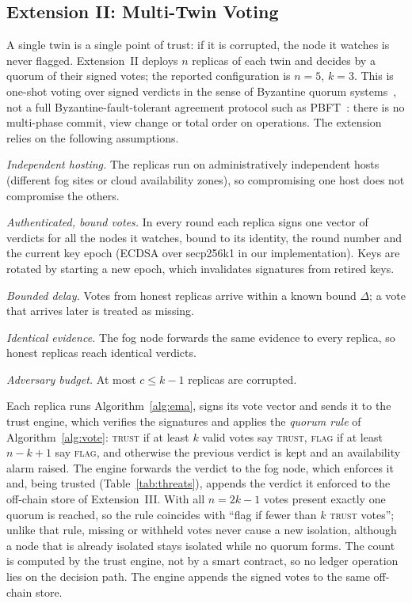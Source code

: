 \documentclass[lineno,pdflatex,sn-nature]{sn-jnl}
\theoremstyle{thmstyleone}%
\theoremstyle{thmstylethree}%
\begin{document}
\subsection{Extension II: Multi-Twin Voting}
\label{sec:ext2}
A single twin is a single point of trust: if it is corrupted, the
node it watches is never flagged.  Extension~II deploys $n$ replicas
of each twin and decides by a quorum of their signed votes; the
reported configuration is $n=5$, $k=3$.  This is one-shot voting over
signed verdicts in the sense of Byzantine quorum
systems~\cite{malkhi1998byzantine}, not a full Byzantine-fault-tolerant
agreement protocol such as PBFT~\cite{castro2002practical}: there is no
multi-phase commit, view change or total order on operations.  The
extension relies on the following assumptions.
\begin{list}{}{\setlength{\leftmargin}{3.4em}\setlength{\labelwidth}{3.0em}\setlength{\labelsep}{0.4em}\setlength{\itemsep}{1pt}\setlength{\parsep}{0pt}}
\item[(B1)] \emph{Independent hosting.}  The replicas run on
administratively independent hosts (different fog sites or cloud
availability zones), so compromising one host does not compromise the
others.
\item[(B2)] \emph{Authenticated, bound votes.}  In every round each
replica signs one vector of verdicts for all the nodes it watches,
bound to its identity, the round number and the current key epoch
(ECDSA over secp256k1 in our implementation).  Keys are rotated by
starting a new epoch, which invalidates signatures from retired keys.
\item[(B3)] \emph{Bounded delay.}  Votes from honest replicas arrive
within a known bound $\Delta$; a vote that arrives later is treated as
missing.
\item[(B4)] \emph{Identical evidence.}  The fog node forwards the same
evidence to every replica, so honest replicas reach identical
verdicts.
\item[(B5)] \emph{Adversary budget.}  At most $c\le k-1$ replicas are
corrupted.
\end{list}
Each replica runs Algorithm~\ref{alg:ema}, signs its vote vector and
sends it to the trust engine, which verifies the signatures and
applies the \emph{quorum rule} of Algorithm~\ref{alg:vote}:
\textsc{trust} if at least $k$ valid votes say \textsc{trust},
\textsc{flag} if at least $n-k+1$ say \textsc{flag}, and otherwise the
previous verdict is kept and an availability alarm raised.
The engine forwards the verdict to the fog node, which enforces it
and, being trusted (Table~\ref{tab:threats}), appends the verdict it
enforced to the off-chain store of Extension~III.  With all
$n=2k-1$ votes present exactly one quorum is reached, so the rule
coincides with ``flag if fewer than $k$ \textsc{trust} votes''; unlike
that rule, missing or withheld votes never cause a new isolation,
although a node that is already isolated stays isolated while no
quorum forms.  The count is computed by the trust engine, not by a smart
contract, so no ledger operation lies on the decision path.  The
engine appends the signed votes to the same off-chain store.
\end{document}
